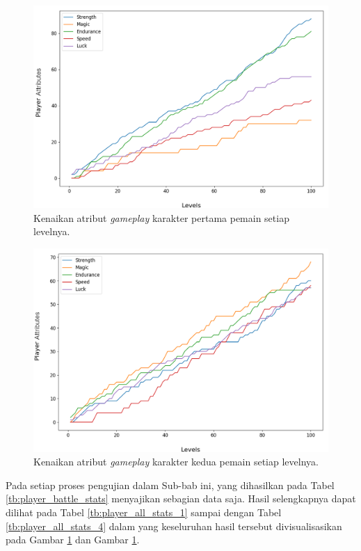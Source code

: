 \begin{figure} [!h] \centering
	\includegraphics[scale=0.47]{img/PlayerStatsDistrib1.png}
	\caption{Kenaikan atribut \textit{gameplay} karakter pertama pemain setiap levelnya.}
	\label{fig:stats_player_1}
\end{figure}
\vspace{1ex}

\begin{figure} [!h] \centering
	\includegraphics[scale=0.47]{img/PlayerStatsDistrib2.png}
	\caption{Kenaikan atribut \textit{gameplay} karakter kedua pemain setiap levelnya.}
	\label{fig:stats_player_2}
\end{figure}

Pada setiap proses pengujian dalam Sub-bab ini, yang dihasilkan pada Tabel \ref{tb:player_battle_stats} menyajikan sebagian data saja. Hasil selengkapnya dapat dilihat pada Tabel \ref{tb:player_all_stats_1} sampai dengan Tabel \ref{tb:player_all_stats_4} dalam  yang keseluruhan hasil tersebut divisualisasikan pada Gambar \ref{fig:stats_player_1} dan Gambar \ref{fig:stats_player_1}.
\vspace{1ex}

